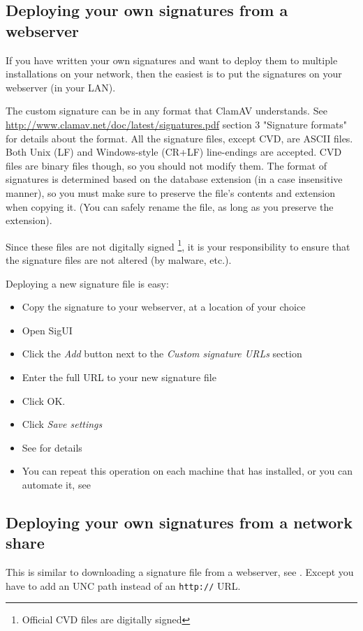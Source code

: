 \subsection{Deploying your own signatures from a webserver}
\label{sec:customweb}
If you have written your own signatures and want to deploy them to multiple
\CW installations on your network, then the easiest is to put the signatures on your webserver (in your LAN).

The custom signature can be in any format that \gls{ClamAV} understands.
See \url{http://www.clamav.net/doc/latest/signatures.pdf} section 3 "Signature formats" for details about the format.
All the signature files, except CVD, are ASCII files. Both Unix (LF) and Windows-style (CR+LF) line-endings are accepted.
CVD files are binary files though, so you should not modify them.
The format of signatures is determined based on the database extension (in a case insensitive manner), so you must make sure to preserve the file's contents and
extension when copying it. (You can safely rename the file, as long as you preserve the extension).

Since these files are not digitally signed \footnote{Official \gls{CVD} files are digitally signed}, it is your responsibility to ensure that the signature files are not altered (by malware, etc.).

Deploying a new signature file is easy:
\begin{itemize}
\item Copy the signature to your webserver, at a location of your choice
\item Open SigUI
\item Click the \emph{Add} button next to the \emph{Custom signature URLs} section
\item Enter the full URL to your new signature file
\item Click OK.
\item Click \emph{Save settings}
\item See  for details
\item You can repeat this operation on each machine that has \CW installed, or you can automate it, see 
\end{itemize}

\subsection{Deploying your own signatures from a network share}
\label{sec:customnet}
This is similar to downloading a signature file from a webserver, see .
Except you have to add an \gls{UNC path} instead of an \verb+http://+ URL.


